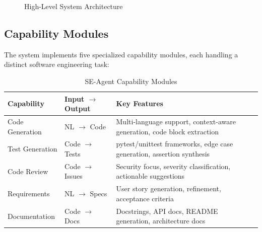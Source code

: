 \documentclass[12pt,a4paper]{article}
\begin{document}
\begin{figure}[H]
\centering
{}
\caption{High-Level System Architecture}
\label{fig:architecture}
\end{figure}

\subsection{Capability Modules}

The system implements five specialized capability modules, each handling a distinct software engineering task:

\begin{table}[H]
\centering
\caption{SE-Agent Capability Modules}
\begin{tabular}{llp{6cm}}
\toprule
\textbf{Capability} & \textbf{Input $\rightarrow$ Output} & \textbf{Key Features} \\
\midrule
Code Generation & NL $\rightarrow$ Code & Multi-language support, context-aware generation, code block extraction \\
Test Generation & Code $\rightarrow$ Tests & pytest/unittest frameworks, edge case generation, assertion synthesis \\
Code Review & Code $\rightarrow$ Issues & Security focus, severity classification, actionable suggestions \\
Requirements & NL $\rightarrow$ Specs & User story generation, refinement, acceptance criteria \\
Documentation & Code $\rightarrow$ Docs & Docstrings, API docs, README generation, architecture docs \\
\bottomrule
\end{tabular}
\label{tab:capabilities}
\end{table}
\end{document}
